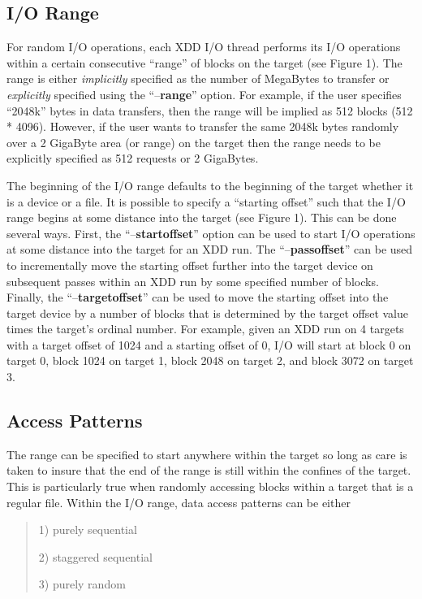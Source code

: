 \subsection{I/O Range}\label{io-range}

For random I/O operations, each XDD I/O thread performs its I/O operations within a certain consecutive ``range'' of blocks on the target (see Figure 1). The range is either \emph{implicitly} specified as the number of MegaBytes to transfer or \emph{explicitly} specified using the ``--\textbf{range}'' option. For example, if the user specifies ``2048k'' bytes in data transfers, then the range will be implied as 512 blocks (512 * 4096). However, if the user wants to transfer the same 2048k bytes randomly over a 2 GigaByte area (or range) on the target then the range needs to be explicitly specified as 512 requests or 2 GigaBytes.

The beginning of the I/O range defaults to the beginning of the target whether it is a device or a file. It is possible to specify a ``starting offset'' such that the I/O range begins at some distance into the target (see Figure 1). This can be done several ways. First, the ``--\textbf{startoffset}'' option can be used to start I/O operations at some distance into the target for an XDD run. The ``--\textbf{passoffset}'' can be used to incrementally move the starting offset further into the target device on subsequent passes within an XDD run by some specified number of blocks. Finally, the ``--\textbf{targetoffset}'' can be used to move the starting offset into the target device by a number of blocks that is determined by the target offset value times the target's ordinal number. For example, given an XDD run on 4 targets with a target offset of 1024 and a starting offset of 0, I/O will start at block 0 on target 0, block 1024 on target 1, block 2048 on target 2, and block 3072 on target 3.

\subsection{Access Patterns}\label{access-patterns}

The range can be specified to start anywhere within the target so long as care is taken to insure that the end of the range is still within the confines of the target. This is particularly true when randomly accessing blocks within a target that is a regular file. Within the I/O range, data access patterns can be either

\begin{quote}
1) purely sequential

2) staggered sequential

3) purely random
\end{quote}

